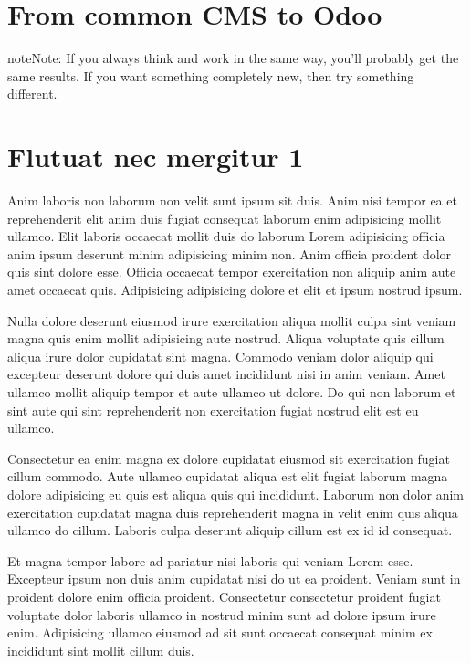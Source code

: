 \documentclass[a4paper,10pt,french]{sphinxmanual}
\begin{document}
\section{From common CMS to Odoo}
\label{\detokenize{docs/tuts/autocad-tut02:from-common-cms-to-odoo}}
\begin{sphinxadmonition}{note}{Note:}
If you always think and work in the same way, you’ll probably get the same results. If you want something completely new,  then try something different.
\end{sphinxadmonition}


\section{Flutuat nec mergitur 1}
\label{\detokenize{docs/tuts/autocad-tut02:flutuat-nec-mergitur-1}}
Anim laboris non laborum non velit sunt ipsum sit duis. Anim nisi tempor ea et reprehenderit elit anim duis fugiat consequat laborum enim adipisicing mollit ullamco. Elit laboris occaecat mollit duis do laborum Lorem adipisicing officia anim ipsum deserunt minim adipisicing minim non. Anim officia proident dolor quis sint dolore esse. Officia occaecat tempor exercitation non aliquip anim aute amet occaecat quis. Adipisicing adipisicing dolore et elit et ipsum nostrud ipsum.

Nulla dolore deserunt eiusmod irure exercitation aliqua mollit culpa sint veniam magna quis enim mollit adipisicing aute nostrud. Aliqua voluptate quis cillum aliqua irure dolor cupidatat sint magna. Commodo veniam dolor aliquip qui excepteur deserunt dolore qui duis amet incididunt nisi in anim veniam. Amet ullamco mollit aliquip tempor et aute ullamco ut dolore. Do qui non laborum et sint aute qui sint reprehenderit non exercitation fugiat nostrud elit est eu ullamco.

Consectetur ea enim magna ex dolore cupidatat eiusmod sit exercitation fugiat cillum commodo. Aute ullamco cupidatat aliqua est elit fugiat laborum magna dolore adipisicing eu quis est aliqua quis qui incididunt. Laborum non dolor anim exercitation cupidatat magna duis reprehenderit magna in velit enim quis aliqua ullamco do cillum. Laboris culpa deserunt aliquip cillum est ex id id consequat.

Et magna tempor labore ad pariatur nisi laboris qui veniam Lorem esse. Excepteur ipsum non duis anim cupidatat nisi do ut ea proident. Veniam sunt in proident dolore enim officia proident. Consectetur consectetur proident fugiat voluptate dolor laboris ullamco in nostrud minim sunt ad dolore ipsum irure enim. Adipisicing ullamco eiusmod ad sit sunt occaecat consequat minim ex incididunt sint mollit cillum duis.
\end{document}
